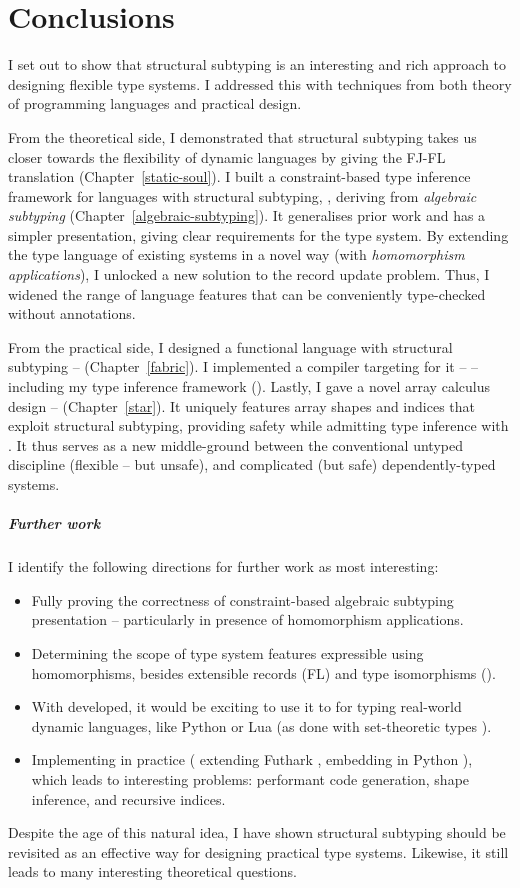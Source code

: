 \chapter{Conclusions}
\label{conclusions}

I set out to show that structural subtyping is an interesting and rich approach to designing flexible type systems. I addressed this with techniques from both theory of programming languages and practical design.

From the theoretical side, I demonstrated that structural subtyping takes us closer towards the flexibility of dynamic languages by giving the FJ-FL translation (Chapter~\ref{static-soul}). 
I built a constraint-based type inference framework for languages with structural subtyping, \textbf{\inference{}}, deriving from \emph{algebraic subtyping} (Chapter~\ref{algebraic-subtyping}). 
It generalises prior work and has a simpler presentation, giving clear requirements for the type system.
By extending the type language of existing systems in a novel way (with \emph{homomorphism applications}), I unlocked a new solution to the record update problem. 
Thus, I widened the range of language features that can be conveniently type-checked without annotations.

From the practical side, I designed a functional language with structural subtyping -- \textbf{\fabric} (Chapter~\ref{fabric}). 
I implemented a compiler targeting \wasm{} for it -- \compiler{} -- including my type inference framework (\inference{}).
Lastly, I gave a novel array calculus design -- \textbf{\starr{}} (Chapter~\ref{star}). It uniquely features array shapes and indices that exploit structural subtyping, providing safety while admitting type inference with \inference{}. It thus serves as a new middle-ground between the conventional untyped discipline (flexible -- but unsafe), and complicated (but safe) dependently-typed systems. 

\paragraph{Further work}
I identify the following directions for further work as most interesting: \begin{itemize}
    \item Fully proving the correctness of constraint-based algebraic subtyping presentation -- particularly in presence of homomorphism applications. 
    \item Determining the scope of type system features expressible using homomorphisms, besides extensible records (FL) and type isomorphisms (\starr{}).
    \item With \inference{} developed, it would be exciting to use it to for typing real-world dynamic languages, like Python or Lua (as done with set-theoretic types \cite{set-theoretic-types-for-elixir, set-theoretic-types-for-erlang, castagna-dynamic}).
    \item Implementing \starr{} in practice (\eg{} extending Futhark \cite{futhark}, embedding in Python \cite{ein}), which leads to interesting problems: performant code generation, shape inference, and recursive indices.
\end{itemize}

Despite the age of this natural idea, I have shown structural subtyping should be revisited as an effective way for designing practical type systems. Likewise, it still leads to many interesting theoretical questions.